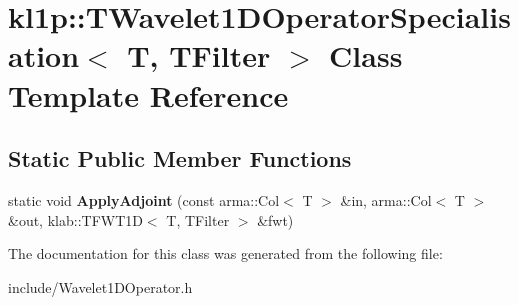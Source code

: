 \hypertarget{classkl1p_1_1TWavelet1DOperatorSpecialisation}{}\section{kl1p\+:\+:T\+Wavelet1\+D\+Operator\+Specialisation$<$ T, T\+Filter $>$ Class Template Reference}
\label{classkl1p_1_1TWavelet1DOperatorSpecialisation}
\subsection*{Static Public Member Functions}
\begin{DoxyCompactItemize}
\item 
static void {\bfseries Apply\+Adjoint} (const arma\+::\+Col$<$ T $>$ \&in, arma\+::\+Col$<$ T $>$ \&out, klab\+::\+T\+F\+W\+T1D$<$ T, T\+Filter $>$ \&fwt)\hypertarget{classkl1p_1_1TWavelet1DOperatorSpecialisation_aacdc649c358d9fb2818340f2343c203f}{}\label{classkl1p_1_1TWavelet1DOperatorSpecialisation_aacdc649c358d9fb2818340f2343c203f}

\end{DoxyCompactItemize}


The documentation for this class was generated from the following file\+:\begin{DoxyCompactItemize}
\item 
include/Wavelet1\+D\+Operator.\+h\end{DoxyCompactItemize}
